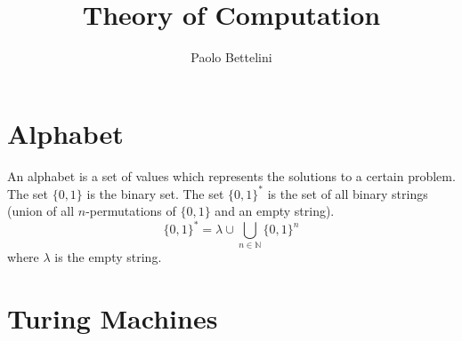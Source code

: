 \documentclass{article}
\title{Theory of Computation}
\author{Paolo Bettelini}
\date{}
\begin{document}
\maketitle
\tableofcontents
\pagebreak

\section{Alphabet}

An alphabet is a set of values which represents the solutions
to a certain problem. \\
The set \(\{0,1\}\) is the binary set. The set \(\{0,1\}^*\) is the set of
all binary strings (union of all \(n\)-permutations of \(\{0,1\}\) and an empty string).
\[
    \{0,1\}^* = \lambda \cup \bigcup_{n\in\mathbb{N}} \{0,1\}^n
\]
where \(\lambda\) is the empty string.

\section{Turing Machines}



\pagebreak
\end{document}
